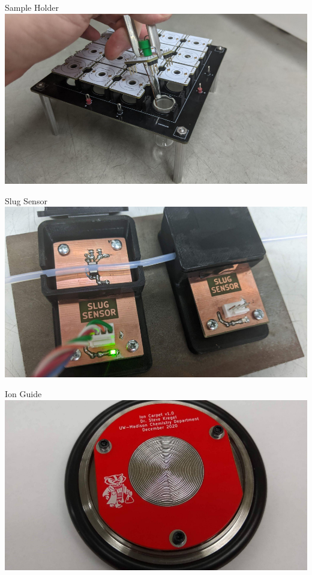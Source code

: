 \documentclass{presentation}
\begin{document}
\begin{frame}{Sample Holder}
  \centering
  \includegraphics[width=\textwidth]{"./sample-holder.png"}
\end{frame}

\begin{frame}{Slug Sensor}
  \centering
  \includegraphics[width=\textwidth]{"./slug-sensor.png"}
\end{frame}

\begin{frame}{Ion Guide}
  \includegraphics[width=\textwidth]{"./ion-carpet.png"}
\end{frame}
\end{document}
